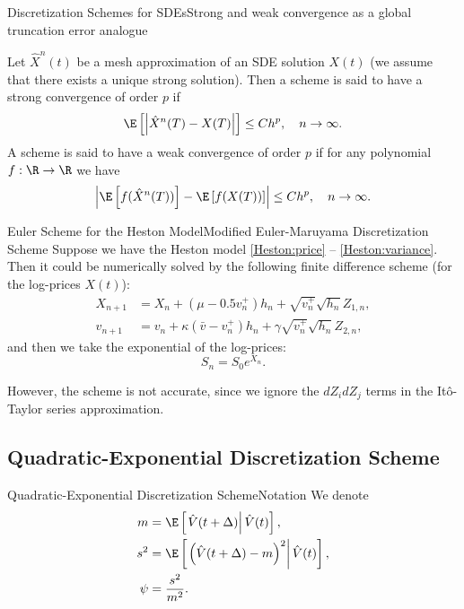 \begin{frame}{Discretization Schemes for SDEs}{Strong and weak convergence as a global truncation error analogue}
    \begin{definition}
        Let $\hat X^n(t)$ be a mesh approximation of an SDE solution $X(t)$ (we assume that there exists a unique strong solution). 
        Then a scheme is said to have a strong convergence of order $p$ if 
        \begin{equation}
            \E\left[\left|\hat X^n(T) - X(T)\right|\right] \leq Ch^p, \quad n \to \infty.
        \end{equation}
        A scheme is said to have a weak convergence of order $p$ if for any polynomial $f: \R \to \R$ we have
        \begin{equation}
            \left|\E\left[f(\hat X^n(T))\right] - \E\left[f(X(T))\right]\right| \leq Ch^p, \quad n \to \infty.
        \end{equation}
    \end{definition}
\end{frame}

\begin{frame}{Euler Scheme for the Heston Model}{Modified Euler-Maruyama Discretization Scheme}
    Suppose we have the Heston model \eqref{Heston:price} -- \eqref{Heston:variance}. Then it could be numerically solved by the following finite difference scheme (for the log-prices $X(t)$):
    \begin{align}
        X_{n+1} & = X_n + (\mu - 0.5 v_n^+)h_n + \sqrt{v_n^+} \sqrt{h_n} Z_{1,n}, \label{Euler:Heston:price:posmod}\\
        v_{n+1} & = v_n + \kappa\left(\bar v - v_n^+\right) h_n + \gamma \sqrt{v_n^+} \sqrt{h_n} Z_{2,n}, \label{Euler:Heston:variance:posmod}
    \end{align}
    and then we take the exponential of the log-prices:
    \begin{equation}
        S_{n} = S_0 e^{X_{n}}.
    \end{equation}
    
    However, the scheme is not accurate, since we ignore the $dZ_idZ_j$ terms in the It\^o-Taylor series approximation.
\end{frame}

\subsection{Quadratic-Exponential Discretization Scheme}
    \begin{frame}{Quadratic-Exponential Discretization Scheme}{Notation}\label{frame:Andersen:denotemeanstd}
        We denote 
        \begin{align}
            m    &= \E\left[\left.\hat{V}(t+\Delta)\right| \hat{V}(t)\right], \\
            s^2  &= \E\left[\left.\left(\hat{V}(t+\Delta) - m\right)^2\right| \hat{V}(t)\right], \\
            \psi &= \frac{s^2}{m^2}.
        \end{align}
    \end{frame}


